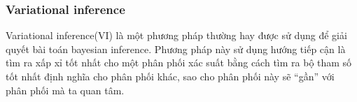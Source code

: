 

 
        
        \subsubsection{Variational inference}
        Variational inference(VI) là một phương pháp thường hay được sử dụng để giải quyết bài toán bayesian inference. 
        Phương pháp này sử dụng hướng tiếp cận là tìm ra xấp xỉ tốt nhất cho một phân phối xác suất bằng cách tìm ra bộ tham số tốt nhất định nghĩa cho phân phối khác, sao cho phân phối này sẽ ``gần'' với phân phối mà ta quan tâm. 
        
